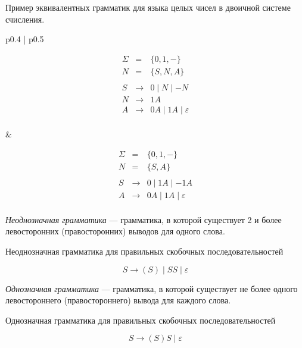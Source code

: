 \begin{example}  Пример эквивалентных грамматик для языка целых чисел в двоичной системе счисления.

  \begin{tabular}{p{} | p{}}

    \[
      \begin{array}{rcl}
      \Sigma &=& \{ 0, 1, - \} \\
      N &=& \{ S, N, A \} \\~\\
      S& \rightarrow & 0 \mid N \mid - N  \\
      N& \rightarrow & 1 A \\
      A& \rightarrow & 0 A \mid 1 A  \mid \varepsilon\\
      \end{array}
    \]

    &

    \[
      \begin{array}{rcl}
      \Sigma &=& \{ 0, 1, - \} \\
      N &=& \{ S, A \} \\~\\
      S& \rightarrow & 0 \mid 1 A  \mid - 1 A  \\
      A& \rightarrow &  0 A \mid 1 A  \mid \varepsilon\\
      \end{array}
    \]
    \end{tabular}

\end{example}


\begin{definition}
  \textit{Неоднозначная грамматика} --- грамматика, в которой существует 2 и более левосторонних (правосторонних) выводов для одного слова.
\end{definition}

\begin{example}
  Неоднозначная грамматика для правильных скобочных последовательностей

\[
    S \to (S) \mid S S \mid \varepsilon
\]
\end{example}

\begin{definition}
  \textit{Однозначная грамматика} --- грамматика, в которой существует не более одного левостороннего (правостороннего) вывода для каждого слова.
\end{definition}

\begin{example}
  Однозначная грамматика для правильных скобочных последовательностей

\[
    S \to (S)S \mid \varepsilon
\]
\end{example}

